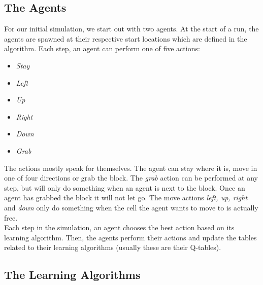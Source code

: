 \subsection{The Agents}
For our initial simulation, we start out with two agents. At the start of a run, the agents are spawned at their respective start locations which are defined in the algorithm. Each step, an agent can perform one of five actions:
\begin{itemize}
\item \textit{Stay}
\item \textit{Left}
\item \textit{Up}
\item \textit{Right}
\item \textit{Down}
\item \textit{Grab}
\end{itemize}
The actions mostly speak for themselves. The agent can stay where it is, move in one of four directions or grab the block. The \textit{grab} action can be performed at any step, but will only do something when an agent is next to the block. Once an agent has grabbed the block it will not let go. The move actions \textit{left, up, right} and \textit{down} only do something when the cell the agent wants to move to is actually free.\\
Each step in the simulation, an agent chooses the best action based on its learning algorithm. Then, the agents perform their actions and update the tables related to their learning algorithms (usually these are their Q-tables).
\subsection{The Learning Algorithms}